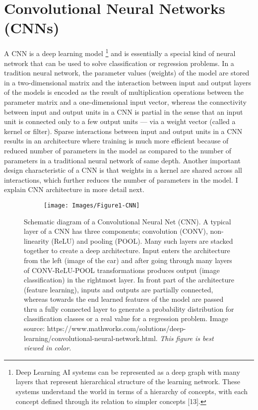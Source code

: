 \documentclass [11pt,letterpaper ,twoside ,openany ]{report}
\begin{document}
     \section{Convolutional Neural Networks (CNNs)}
     A CNN is a deep learning model \footnote {Deep Learning AI systems can be represented as a deep graph with many layers that represent hierarchical structure of the learning network. These systems understand the world in terms of a hierarchy of concepts, with each concept defined through its relation to simpler concepts [13].} and is essentially a special kind of neural network that can be used to solve classification or regression problems. In a tradition neural network, the parameter values (weights) of the model are stored in a two-dimensional matrix and the interaction between input and output layers of the models is encoded as the result of multiplication operations between the parameter matrix and a one-dimensional input vector, whereas the connectivity between input and output units in a CNN is partial in the sense that an input unit is connected only to a few output units --- via a weight vector (called a kernel or filter). Sparse interactions between input and output units in a CNN results in an architecture where training is much more efficient because of reduced number of parameters in the model as compared to the number of parameters in a traditional neural network of same depth. Another important design characteristic of a CNN is that weights in a kernel are shared across all interactions, which further reduces the number of parameters in the model. I explain CNN architecture in more detail next. 

    \begin{figure}[h]
      \centering
      \begin{subfigure}[b]{1.00\linewidth}
        \texttt{[image: Images/Figure1-CNN]}
      \end{subfigure}
      \caption{Schematic diagram of a Convolutional Neural Net (CNN). A typical layer of a CNN has three components; convolution (CONV), non-linearity (ReLU) and pooling (POOL). Many such layers are stacked together to create a deep architecture. Input enters the architecture from the left (image of the car) and after going through many layers of CONV-ReLU-POOL transformations produces output (image classification) in the rightmost layer. In front part of the architecture (feature learning), inputs and outputs are partially connected, whereas towards the end learned features of the model are passed thru a fully connected layer to generate a probability distribution for classification classes or a real value for a regression problem. Image source: https://www.mathworks.com/solutions/deep-learning/convolutional-neural-network.html. \textit{This figure is best viewed in color.}}
      \label{fig:cnn}
    \end{figure}
\end{document}
